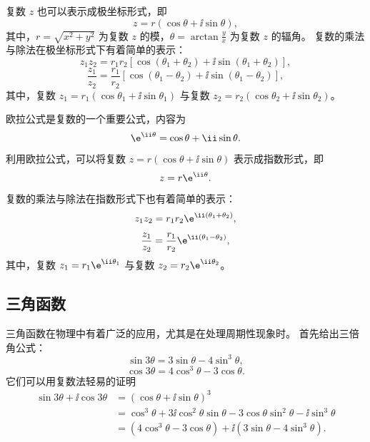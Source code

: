 复数 $ z $ 也可以表示成极坐标形式，即
\begin{equation}
    z = r (\cos \theta + \ii \sin \theta) ,
\end{equation}
其中，$ r = \sqrt{x^2 + y^2} $ 为复数 $ z $ 的模，$ \theta = \arctan \frac{y}{x} $ 为复数 $ z $ 的辐角。
复数的乘法与除法在极坐标形式下有着简单的表示：
\begin{equation}
    z_1 z_2 = r_1 r_2 [\cos (\theta_1 + \theta_2) + \ii \sin (\theta_1 + \theta_2)] ,
\end{equation}
\begin{equation}
    \frac{z_1}{z_2} = \frac{r_1}{r_2} [\cos (\theta_1 - \theta_2) + \ii \sin (\theta_1 - \theta_2)] ,
\end{equation}
其中，复数 $ z_1 = r_1 (\cos \theta_1 + \ii \sin \theta_1) $ 与复数 $ z_2 = r_2 (\cos \theta_2 + \ii \sin \theta_2) $。

欧拉公式是复数的一个重要公式，内容为
\begin{equation}
    \e^{\ii \theta} = \cos \theta + \ii \sin \theta .
\end{equation}
利用欧拉公式，可以将复数 $ z = r (\cos \theta + \ii \sin \theta) $ 表示成指数形式，即
\begin{equation}
    z = r \e^{\ii \theta} .
\end{equation}
复数的乘法与除法在指数形式下也有着简单的表示：
\begin{equation}
    z_1 z_2 = r_1 r_2 \e^{\ii (\theta_1 + \theta_2)} ,
\end{equation}
\begin{equation}
    \frac{z_1}{z_2} = \frac{r_1}{r_2} \e^{\ii (\theta_1 - \theta_2)} ,
\end{equation}
其中，复数 $ z_1 = r_1 \e^{\ii \theta_1} $ 与复数 $ z_2 = r_2 \e^{\ii\theta_2} $。



\subsection{三角函数}\label{subsec:trigonometric-functions}
三角函数在物理中有着广泛的应用，尤其是在处理周期性现象时。
首先给出三倍角公式：
\begin{equation}
    \sin 3\theta = 3 \sin \theta - 4 \sin^3 \theta ,
\end{equation}
\begin{equation}
    \cos 3\theta = 4 \cos^3 \theta - 3 \cos \theta .
\end{equation}
它们可以用复数法轻易的证明
\begin{equation}
    \begin{aligned}
        \sin 3\theta + \ii \cos 3\theta & = (\cos \theta + \ii \sin \theta)^3                                                                 \\
                                        & = \cos^3 \theta + 3 \ii \cos^2 \theta \sin \theta - 3 \cos \theta \sin^2 \theta - \ii \sin^3 \theta \\
                                        & = (4 \cos^3 \theta - 3 \cos \theta) + \ii (3 \sin \theta - 4 \sin^3 \theta) .
    \end{aligned}
\end{equation}

